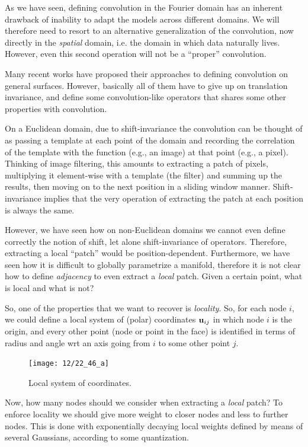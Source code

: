
As we have seen, defining convolution in the Fourier domain has an inherent drawback of inability to adapt the models across different domains. We will therefore need to resort to an alternative generalization of the convolution, now directly in the \emph{spatial} domain, i.e. the domain in which data naturally lives. However, even this second operation will not be a ``proper'' convolution.

Many recent works have proposed their approaches to defining convolution on general surfaces. However, basically all of them have to give up on translation invariance, and define some convolution-like operators that shares some other properties with convolution.

On a Euclidean domain, due to shift-invariance the convolution can be thought of as passing a template at each point of the domain and recording the correlation of the template with the function (e.g., an image) at that point (e.g., a pixel). Thinking of image filtering, this amounts to extracting a patch of pixels, multiplying it element-wise with a template (the filter) and summing up the results, then moving on to the next position in a sliding window manner. Shift-invariance implies that the very operation of extracting the patch at each position is always the same.

However, we have seen how on non-Euclidean domains we cannot even define correctly the notion of shift, let alone shift-invariance of operators. Therefore, extracting a local ``patch'' would be position-dependent. Furthermore, we have seen how it is difficult to globally parametrize a manifold, therefore it is not clear how to define \emph{adjacency} to even extract a \emph{local} patch. Given a certain point, what is local and what is not?

So, one of the properties that we want to recover is \emph{locality}. So, for each node $i$, we could define a local system of (polar) coordinates $\vb{u}_{ij}$ in which node $i$ is the origin, and every other point (node or point in the face) is identified in terms of radius and angle wrt an axis going from $i$ to some other point $j$. 
\begin{figure}[H]
	\centering
	\texttt{[image: 12/22\_46\_a]}
	\caption{Local system of coordinates.}\label{fig:local-coord}	
\end{figure}

Now, how many nodes should we consider when extracting a \emph{local} patch? To enforce locality we should give more weight to closer nodes and less to further nodes. This is done with exponentially decaying local weights defined by means of several Gaussians, according to some quantization.

